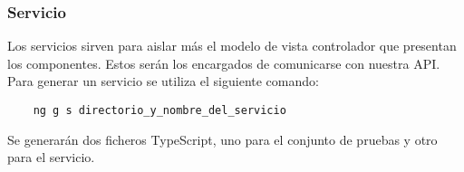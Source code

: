 \subsubsection{Servicio}
Los servicios sirven para aislar más el modelo de vista controlador que presentan los componentes. Estos serán los encargados de comunicarse con nuestra API.
\\Para generar un servicio se utiliza el siguiente comando:
\begin{verbatim}
    ng g s directorio_y_nombre_del_servicio
\end{verbatim}
Se generarán dos ficheros TypeScript, uno para el conjunto de pruebas y otro para el servicio.